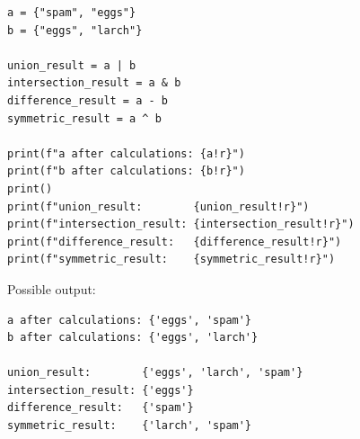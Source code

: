 \begin{verbatim}
a = {"spam", "eggs"}
b = {"eggs", "larch"}

union_result = a | b
intersection_result = a & b
difference_result = a - b
symmetric_result = a ^ b

print(f"a after calculations: {a!r}")
print(f"b after calculations: {b!r}")
print()
print(f"union_result:        {union_result!r}")
print(f"intersection_result: {intersection_result!r}")
print(f"difference_result:   {difference_result!r}")
print(f"symmetric_result:    {symmetric_result!r}")
\end{verbatim}

Possible output:

\begin{verbatim}
a after calculations: {'eggs', 'spam'}
b after calculations: {'eggs', 'larch'}

union_result:        {'eggs', 'larch', 'spam'}
intersection_result: {'eggs'}
difference_result:   {'spam'}
symmetric_result:    {'larch', 'spam'}
\end{verbatim}